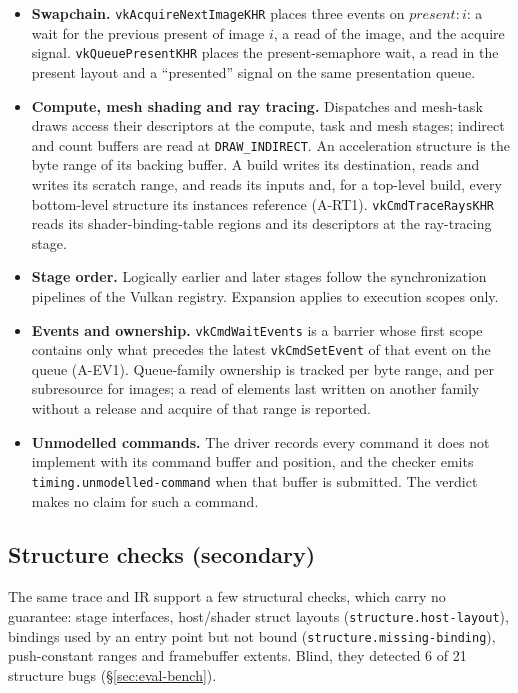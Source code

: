 \documentclass[acmtog,anonymous,review]{acmart}
\newcommand{\code}[1]{\texttt{#1}}
\begin{document}
\begin{itemize}
\item \textbf{Swapchain.} \code{vkAcquireNextImageKHR} places three events on $\mathit{present}{:}i$: a wait for
  the previous present of image $i$, a read of the image, and the acquire signal. \code{vkQueuePresentKHR} places
  the present-semaphore wait, a read in the present layout and a ``presented'' signal on the same presentation
  queue.
\item \textbf{Compute, mesh shading and ray tracing.} Dispatches and mesh-task draws access their descriptors at the
  compute, task and mesh stages; indirect and count buffers are read at \code{DRAW\_INDIRECT}. An acceleration
  structure is the byte range of its backing buffer. A build writes its destination, reads and writes its scratch
  range, and reads its inputs and, for a top-level build, every bottom-level structure its instances reference
  (A-RT1). \code{vkCmdTraceRaysKHR} reads its shader-binding-table regions and its descriptors at the ray-tracing
  stage.
\item \textbf{Stage order.} Logically earlier and later stages follow the synchronization pipelines of the Vulkan
  registry. Expansion applies to execution scopes only.
\item \textbf{Events and ownership.} \code{vkCmdWaitEvents} is a barrier whose first scope contains only what precedes
  the latest \code{vkCmdSetEvent} of that event on the queue (A-EV1). Queue-family ownership is tracked per byte
  range, and per subresource for images; a read of elements last written on another family without a release and
  acquire of that range is reported.
\item \textbf{Unmodelled commands.} The driver records every command it does not implement with its command buffer
  and position, and the checker emits \code{timing.unmodelled-command} when that buffer is submitted. The verdict
  makes no claim for such a command.
\end{itemize}

\subsection{Structure checks (secondary)}
\label{sec:structure}
The same trace and IR support a few structural checks, which carry no guarantee: stage interfaces, host/shader struct
layouts (\code{structure.host-layout}), bindings used by an entry point but not bound (\code{structure.missing-binding}),
push-constant ranges and framebuffer extents. Blind, they detected 6 of 21 structure bugs (\S\ref{sec:eval-bench}).
\end{document}

